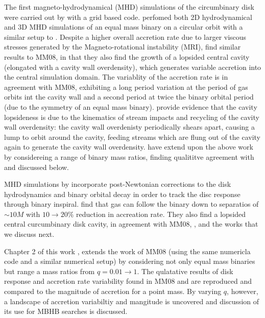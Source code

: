 The first magneto-hydrodynamical (MHD) simulations of the circumbinary disk
were carried out by \cite{ShiKrolik:2012} with a grid based code.
\cite{ShiKrolik:2012}  perfomed both 2D hydrodynamical and 3D MHD simulations
of an equal mass binary on a circular orbit with a similar setup to
\citep{MacFadyen:2008}. Despite a higher overall accretion rate due to larger
viscous stresses generated by the Magneto-rotational instability (MRI),
\cite{ShiKrolik:2012} find similar results to MM08, in that they also find the
growth of a lopsided central cavity (elongated with a cavity wall
overdensity), which generates variable accretion into the central simulation
domain. The variablity of the accretion rate is in agreement with MM08,
exhibiting a long period variation at the period of gas orbits int the cavity
wall and a second period at twice the binary orbital period (due to the
symmetry of an equal mass binary). \cite{ShiKrolik:2012} provide evidence that
the cavity lopsideness is due to the kinematics of stream impacts and
recycling of the cavity wall overdensity: the cavity wall overdenisty
periodically shears apart, causing a lump to orbit around the cavity, feeding
streams which are flung out of the cavity again to generate the cavity wall
overdensity. \cite{ShiKrolik:2015} have extend upon the above work by
considereing a range of binary mass ratios, finding qualititve agreement with
\cite{DHM:2013:MNRAS} and \cite{Farris:2014} discussed below.

MHD simulations by \citep{Noble+2012} incorporate post-Newtonian corrections
to the disk hydrodynamics and binary orbital decay in order to track the disc
response through binary inspiral. \citep{Noble+2012} find that gas can follow
the binary down to separatios of $\sim10M$ with $10 \rightarrow 20\%$
reduction in accreation rate. They also find a lopsided central curcumbinary
disk cavity, in agreement with MM08, \citep{ShiKrolik:2012}, and the works
that we discuss next.

Chapter 2 of this work \citep{DHM:2013:MNRAS}, extends the work of MM08 (using
the same numericla code and a similar numerical setup) by considering not only
equal mass binaries but range a mass ratios from $q=0.01 \rightarrow 1$. The
qulatative results of disk response and accretion rate variability found in
MM08 and \citep{ShiKrolik:2012} are reproduced and compared to the magnitude
of accretion for a point mass. By varying $q$, however, a landscape of
accretion variabiltiy and mangitude is uncovered and discussion of its use for
MBHB searches is discussed.

